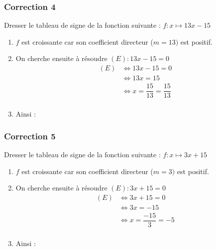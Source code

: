 \documentclass[15pt, mathserif]{beamer}
\begin{document}
\begin{frame}
\vspace{-10mm}
	\frametitle{Correction 4}
\vspace*{1cm} 
 \footnotesize{Dresser le tableau de signe de la fonction suivante : $ f:x\mapsto13x-15$} 
 \begin{enumerate} 
 \item $f$ est croissante car son coefficient directeur ($m=13)$ est positif.
 \item On cherche ensuite à résoudre  $(E) : 13x-15=0 $	 
 \begin{align*} (E)& \Leftrightarrow 13x-15=0\\
		 	 & \Leftrightarrow 13x=15\\
			 & \Leftrightarrow x= \dfrac{15}{13}=\dfrac{15}{13}\\
	 \end{align*} 
 \item Ainsi : \\ 
 \end{enumerate} 
 \end{frame}


\begin{frame}
\vspace{-10mm}
	\frametitle{Correction 5}
\vspace*{1cm} 
 \footnotesize{Dresser le tableau de signe de la fonction suivante : $ f:x\mapsto3x+15$} 
 \begin{enumerate} 
 \item $f$ est croissante car son coefficient directeur ($m=3)$ est positif.
 \item On cherche ensuite à résoudre  $(E) : 3x+15=0 $	 
 \begin{align*} (E)& \Leftrightarrow 3x+15=0\\
		 	 & \Leftrightarrow 3x=-15\\
			 & \Leftrightarrow x= \dfrac{-15}{3}=-5\\
	 \end{align*} 
 \item Ainsi : \\ 
 \end{enumerate} 
 \end{frame}
\end{document}
